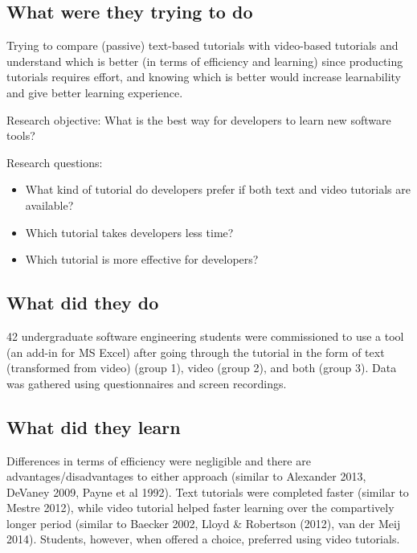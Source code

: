 \subsection{What were they trying to do}

Trying to compare (passive) text-based tutorials with video-based tutorials and understand which is better (in terms of efficiency and learning) since producting tutorials requires effort, and knowing which is better would increase learnability and give better learning experience.

Research objective: What is the best way for developers to learn new software tools?

Research questions:

\begin{itemize}
    \item What kind of tutorial do developers prefer if both text and video tutorials are available?
    \item Which tutorial takes developers less time?
    \item Which tutorial is more effective for developers?
\end{itemize}


\subsection{What did they do}

42 undergraduate software engineering students were commissioned to use a tool (an add-in for MS Excel) after going through the tutorial in the form of text (transformed from video) (group 1), video (group 2), and both (group 3). Data was gathered using questionnaires and screen recordings.

\subsection{What did they learn}

Differences in terms of efficiency were negligible and there are advantages/disadvantages to either approach (similar to Alexander 2013, DeVaney 2009, Payne et al 1992). Text tutorials were completed faster (similar to Mestre 2012), while video tutorial helped faster learning over the compartively longer period (similar to Baecker 2002, Lloyd \& Robertson (2012), van der Meij 2014). Students, however, when offered a choice, preferred using video tutorials.

